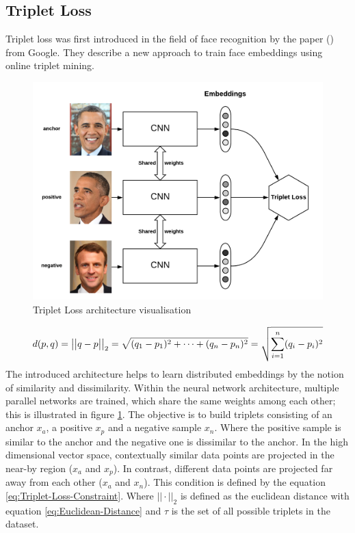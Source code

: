 \subsection{Triplet Loss}
\label{sub:Triplet-Loss}

Triplet loss was first introduced in the field of face recognition by the paper (\cite{schroff_facenet_2015}) from Google. They describe a new approach to train face embeddings using online triplet mining.
\begin{figure}[htbp]
	\centering
	\includegraphics[scale=0.35]{baa-documentation/img/Triplet_Loss_Architecture.png}
	\caption[Triplet Loss architecture visualisation]{Triplet Loss architecture visualisation \footnotemark}
	\label{fig:Triplet-Loss-Architecture}
\end{figure}
\noindent
{}
\begin{equation}
    \centering
    \begin{gathered}
        d(p,q) = \big|\big|q-p\big|\big|_2 = \sqrt{(q_1 - p_1)^2 + \dots + (q_n - p_n)^2} = \sqrt{\sum_{i=1}^n (q_i - p_i)^2}
    \end{gathered}
    \label{eq:Euclidean-Distance}
\end{equation}
\noindent
The introduced architecture helps to learn distributed embeddings by the notion of similarity and dissimilarity. Within the neural network architecture, multiple parallel networks are trained, which share the same weights among each other; this is illustrated in figure \ref{fig:Triplet-Loss-Architecture}. The objective is to build triplets consisting of an anchor $x_a$, a positive $x_p$ and a negative sample $x_n$. Where the positive sample is similar to the anchor and the negative one is dissimilar to the anchor. In the high dimensional vector space, contextually similar data points are projected in the near-by region ($x_a$ and $x_p$). In contrast, different data points are projected far away from each other ($x_a$ and $x_n$). This condition is defined by the equation \ref{eq:Triplet-Loss-Constraint}. Where $|| \cdot ||_2$ is defined as the euclidean distance with equation \ref{eq:Euclidean-Distance} and $\tau$ is the set of all possible triplets in the dataset.

